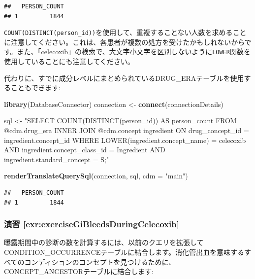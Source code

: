 \documentclass[
  11pt]{book}
\newenvironment{Shaded}{\begin{snugshade}}{\end{snugshade}}
\newcommand{\AttributeTok}[1]{\textcolor[rgb]{0.13,0.29,0.53}{#1}}
\newcommand{\FunctionTok}[1]{\textcolor[rgb]{0.13,0.29,0.53}{\textbf{#1}}}
\newcommand{\NormalTok}[1]{#1}
\newcommand{\OtherTok}[1]{\textcolor[rgb]{0.56,0.35,0.01}{#1}}
\newcommand{\StringTok}[1]{\textcolor[rgb]{0.31,0.60,0.02}{#1}}
\theoremstyle{definition}
\theoremstyle{definition}
\theoremstyle{definition}
\theoremstyle{definition}
\theoremstyle{remark}
\begin{document}
\begin{verbatim}
##   PERSON_COUNT
## 1         1844
\end{verbatim}

\texttt{COUNT(DISTINCT(person\_id))}を使用して、重複することない人数を求めることに注意してください。これは、各患者が複数の処方を受けたかもしれないからです。また、「celecoxib」の検索で、大文字小文字を区別しないように\texttt{LOWER}関数を使用していることにも注意してください。

代わりに、すでに成分レベルにまとめられているDRUG\_ERAテーブルを使用することもできます:

\begin{Shaded}
\begin{Highlighting}[]
\FunctionTok{library}\NormalTok{(DatabaseConnector)}
\NormalTok{connection }\OtherTok{\textless{}{-}} \FunctionTok{connect}\NormalTok{(connectionDetails)}

\NormalTok{sql }\OtherTok{\textless{}{-}} \StringTok{"SELECT COUNT(DISTINCT(person\_id)) AS person\_count}
\StringTok{FROM @cdm.drug\_era}
\StringTok{INNER JOIN @cdm.concept ingredient}
\StringTok{  ON drug\_concept\_id = ingredient.concept\_id}
\StringTok{WHERE LOWER(ingredient.concept\_name) = \textquotesingle{}celecoxib\textquotesingle{}}
\StringTok{  AND ingredient.concept\_class\_id = \textquotesingle{}Ingredient\textquotesingle{}}
\StringTok{  AND ingredient.standard\_concept = \textquotesingle{}S\textquotesingle{};"}

\FunctionTok{renderTranslateQuerySql}\NormalTok{(connection, sql, }\AttributeTok{cdm =} \StringTok{"main"}\NormalTok{)}
\end{Highlighting}
\end{Shaded}

\begin{verbatim}
##   PERSON_COUNT
## 1         1844
\end{verbatim}

\subsubsection*{演習 \ref{exr:exerciseGiBleedsDuringCelecoxib}}\label{ux6f14ux7fd2-refexrexercisegibleedsduringcelecoxib}

曝露期間中の診断の数を計算するには、以前のクエリを拡張してCONDITION\_OCCURRENCEテーブルに結合します。消化管出血を意味するすべてのコンディションのコンセプトを見つけるために、CONCEPT\_ANCESTORテーブルに結合します:
\end{document}
